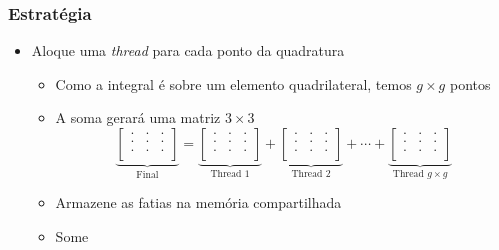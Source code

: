 \documentclass{beamer}
\begin{document}
\begin{frame}
\frametitle{Estratégia}
\begin{itemize}
\item Aloque uma \textit{thread} para cada ponto da quadratura
	\begin{itemize}
	\item Como a integral é sobre um elemento quadrilateral, temos $g \times g$ pontos
	\item A soma gerará uma matriz $3 \times 3$
\[
  \underbrace{
  \left[\begin{array}{ccc}
         . & . & .\\
         . & . & .\\
         . & . & .\\
  \end{array}\right]
  }_{\text{Final}}
    =
  \underbrace{ 
  \left[\begin{array}{ccc}
         . & . & .\\
         . & . & .\\
         . & . & .\\
  \end{array}\right]
  }_{\text{Thread 1}}
    +
  \underbrace{
  \left[\begin{array}{ccc}
         . & . & .\\
         . & . & .\\
         . & . & .\\
  \end{array}\right]
  }_{\text{Thread 2}}
    +
   \cdots
    +
  \underbrace{
  \left[\begin{array}{ccc}
         . & . & .\\
         . & . & .\\
         . & . & .\\
  \end{array}\right]
  }_{\text{Thread } g \times g}

\]

\item Armazene as fatias na memória compartilhada
\item Some

\end{itemize}

\end{itemize}
\end{frame}

\end{document}
